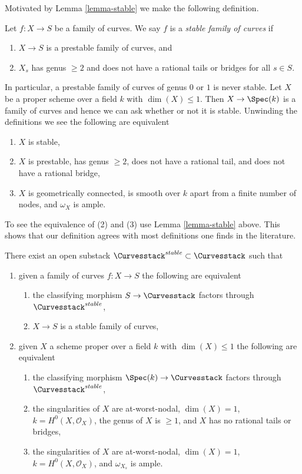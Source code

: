 \noindent
Motivated by Lemma \ref{lemma-stable} we make the following definition.

\begin{definition}
\label{definition-stable}
Let $f : X \to S$ be a family of curves.
We say $f$ is a {\it stable family of curves} if
\begin{enumerate}
\item $X \to S$ is a prestable family of curves, and
\item $X_s$ has genus $\geq 2$ and does not have a rational tails
or bridges for all $s \in S$.
\end{enumerate}
\end{definition}

\noindent
In particular, a prestable family of curves of genus $0$ or $1$ is never
stable.
Let $X$ be a proper scheme over a field $k$ with $\dim(X) \leq 1$.
Then $X \to \Spec(k)$ is a family of curves and hence we can ask
whether or not it is stable. Unwinding the definitions we see
the following are equivalent
\begin{enumerate}
\item $X$ is stable,
\item $X$ is prestable, has genus $\geq 2$, does not have a rational tail,
and does not have a rational bridge,
\item $X$ is geometrically connected, is smooth over $k$
apart from a finite number of nodes, and $\omega_X$ is ample.
\end{enumerate}
To see the equivalence of (2) and (3) use
Lemma \ref{lemma-stable} above.
This shows that our definition agrees with most definitions one finds
in the literature.

\begin{lemma}
\label{lemma-stable-curves}
There exist an open substack $\Curvesstack^{stable} \subset \Curvesstack$
such that
\begin{enumerate}
\item given a family of curves $f : X \to S$ the following are equivalent
\begin{enumerate}
\item the classifying morphism $S \to \Curvesstack$ factors
through $\Curvesstack^{stable}$,
\item $X \to S$ is a stable family of curves,
\end{enumerate}
\item given $X$ a scheme proper over a field $k$ with
$\dim(X) \leq 1$ the following are equivalent
\begin{enumerate}
\item the classifying morphism $\Spec(k) \to \Curvesstack$
factors through $\Curvesstack^{stable}$,
\item the singularities of $X$ are at-worst-nodal, $\dim(X) = 1$,
$k = H^0(X, \mathcal{O}_X)$, the genus of $X$ is $\geq 1$, and
$X$ has no rational tails or bridges,
\item the singularities of $X$ are at-worst-nodal, $\dim(X) = 1$,
$k = H^0(X, \mathcal{O}_X)$, and $\omega_{X_s}$ is ample.
\end{enumerate}
\end{enumerate}
\end{lemma}


